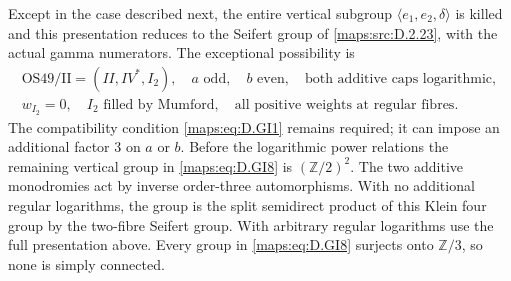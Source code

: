 \begin{theorem}
Except in the case described next, the entire vertical
subgroup $\langle e_1,e_2,\delta\rangle$ is killed and this
presentation reduces to the Seifert group of \ref{maps:src:D.2.23}, with
the actual gamma numerators. The exceptional possibility is
\[
\begin{gathered}
 \mathrm{OS49/II}=(II,IV^*,I_2),\quad a\text{ odd},\quad
 b\text{ even},\quad\text{both additive caps logarithmic},\\
 w_{I_2}=0,\quad I_2\text{ filled by Mumford},\quad
 \text{all positive weights at regular fibres}.
\end{gathered}                                             \tag{D.GI8}\label{maps:eq:D.GI8}
\]
The compatibility condition \eqref{maps:eq:D.GI1} remains required; it
can impose an additional factor $3$ on $a$ or $b$.
Before the logarithmic power relations the remaining
vertical group in \eqref{maps:eq:D.GI8} is $(\mathbb Z/2)^2$. The two
additive monodromies act by inverse order-three
automorphisms. With no additional regular logarithms,
the group is the split semidirect product of this Klein
four group by the two-fibre Seifert group. With arbitrary
regular logarithms use the full presentation above.
Every group in \eqref{maps:eq:D.GI8} surjects onto $\mathbb Z/3$, so none
is simply connected.

\end{theorem}


